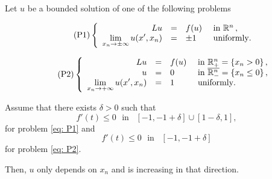 \begin{proposition}
\label{Prop: HalfSpaceLimUnif}
Let $u$ be a bounded solution of one of the following problems

\begin{equation}
\leqnomode
\tag{P1}
\label{eq: P1}
\beqc{\PDEsystem}
L u &=& f(u)  &\textrm{ in }\R^n\,,\\
\ds \lim_{x_n \to \pm \infty} u(x',x_n) &=& \pm 1 \,\,\, &\textrm{ uniformly}.
\eeqc
\end{equation}

\begin{equation}
\leqnomode
\tag{P2}
\label{eq: P2}
\beqc{\PDEsystem}
L u &=& f(u)  &\textrm{ in }\R^n_+ = \{ x_n>0\} \,,\\ 
u &=& 0  &\textrm{ in }\overline{\R^n_-} = \{ x_n\leq 0\}\,,\\
\ds \lim_{x_n \to + \infty} u(x',x_n) &=& 1 \,\,\, &\textrm{ uniformly}.
\eeqc
\end{equation}

\reqnomode

Assume that there exists $\delta > 0$ such that
$$ f'(t) \leq 0 \,\, \text{ in } \,\,\, [-1,-1+\delta]\cup[1-\delta,1], $$
for problem \eqref{eq: P1} and
$$ f'(t) \leq 0 \,\, \text{ in } \,\,\, [-1,-1+\delta] $$
for problem \eqref{eq: P2}.

Then, $u$ only depends on $x_n$ and is increasing in that direction.
\end{proposition}

